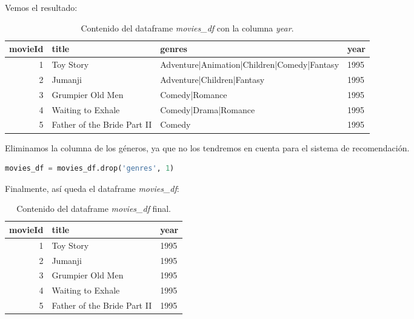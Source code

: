 \documentclass{uimppracticas}
\begin{document}
Vemos el resultado:

\begin{table}[h]
	\centering
	\begin{tabular}{rlll}
		\toprule
		movieId &                        title &                                       genres &  year \\
		\midrule
		1 &                    Toy Story &  Adventure|Animation|Children|Comedy|Fantasy &  1995 \\
		2 &                      Jumanji &                   Adventure|Children|Fantasy &  1995 \\
		3 &             Grumpier Old Men &                               Comedy|Romance &  1995 \\
		4 &            Waiting to Exhale &                         Comedy|Drama|Romance &  1995 \\
		5 &  Father of the Bride Part II &                                       Comedy &  1995 \\
		\bottomrule
	\end{tabular}
	\caption{Contenido del dataframe \textit{movies\_df} con la columna \textit{year}.}
	\label{movies_df_years}
\end{table}

Eliminamos la columna de los géneros, ya que no los tendremos en cuenta para el sistema de recomendación.

\begin{lstlisting}[language=python]
movies_df = movies_df.drop('genres', 1)
\end{lstlisting}

Finalmente, así queda el dataframe \textit{movies\_df}:

\begin{table}[h]
	\centering
	\begin{tabular}{rll}
		\toprule
		movieId &                        title &  year \\
		\midrule
		1 &                    Toy Story &  1995 \\
		2 &                      Jumanji &  1995 \\
		3 &             Grumpier Old Men &  1995 \\
		4 &            Waiting to Exhale &  1995 \\
		5 &  Father of the Bride Part II &  1995 \\
		\bottomrule
	\end{tabular}
	\caption{Contenido del dataframe \textit{movies\_df} final.}
	\label{movies_df_final}
\end{table}
\end{document}

